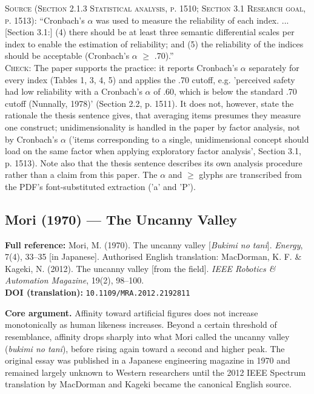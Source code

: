 \documentclass[11pt, a4paper]{article}
\begin{document}
\begin{itemize}[leftmargin=1.2em,itemsep=4pt]
\textsc{Source (Section 2.1.3 Statistical analysis, p. 1510; Section 3.1 Research goal, p. 1513):} ``Cronbach's $\alpha$ was used to measure the reliability of each index. ... [Section 3.1:] (4) there should be at least three semantic differential scales per index to enable the estimation of reliability; and (5) the reliability of the indices should be acceptable (Cronbach's $\alpha$ $\geq$ .70).''\\
\textsc{Check:} The paper supports the practice: it reports Cronbach's $\alpha$ separately for every index (Tables 1, 3, 4, 5) and applies the .70 cutoff, e.g. 'perceived safety had low reliability with a Cronbach's $\alpha$ of .60, which is below the standard .70 cutoff (Nunnally, 1978)' (Section 2.2, p. 1511). It does not, however, state the rationale the thesis sentence gives, that averaging items presumes they measure one construct; unidimensionality is handled in the paper by factor analysis, not by Cronbach's $\alpha$ ('items corresponding to a single, unidimensional concept should load on the same factor when applying exploratory factor analysis', Section 3.1, p. 1513). Note also that the thesis sentence describes its own analysis procedure rather than a claim from this paper. The $\alpha$ and $\geq$ glyphs are transcribed from the PDF's font-substituted extraction ('a' and 'P').
\end{itemize}

\vspace{8pt}
\subsection{Mori (1970) --- The Uncanny Valley}

\begin{refbox}
\textbf{Full reference:} Mori, M. (1970). The uncanny valley [\textit{Bukimi no tani}]. \textit{Energy}, 7(4), 33--35 [in Japanese]. Authorised English translation: MacDorman, K. F. \& Kageki, N. (2012). The uncanny valley [from the field]. \textit{IEEE Robotics \& Automation Magazine}, 19(2), 98--100.\\[4pt]
\textbf{DOI (translation):} \texttt{10.1109/MRA.2012.2192811}
\end{refbox}

\textbf{Core argument.} Affinity toward artificial figures does not increase monotonically as human likeness increases. Beyond a certain threshold of resemblance, affinity drops sharply into what Mori called the uncanny valley (\textit{bukimi no tani}), before rising again toward a second and higher peak. The original essay was published in a Japanese engineering magazine in 1970 and remained largely unknown to Western researchers until the 2012 IEEE Spectrum translation by MacDorman and Kageki became the canonical English source.
\end{document}
